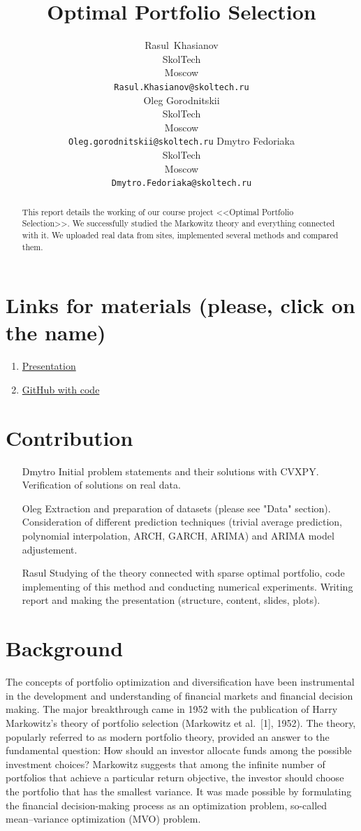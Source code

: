 \documentclass{article}
\title{Optimal Portfolio Selection}
\author{
  Rasul~Khasianov \\
  SkolTech\\
  Moscow \\
  \texttt{Rasul.Khasianov@skoltech.ru} \\
  \And
  Oleg Gorodnitskii\\
  SkolTech\\
  Moscow\\
  \texttt{Oleg.gorodnitskii@skoltech.ru}
  \And
  Dmytro Fedoriaka\\
  SkolTech\\
  Moscow\\
  \texttt{Dmytro.Fedoriaka@skoltech.ru}\\
}
\begin{document}
\maketitle

\begin{abstract} 
This report details the working of our course project <<Optimal Portfolio Selection>>. We successfully studied the Markowitz theory and everything connected with it. We uploaded real data from sites, implemented several methods and compared them.
\end{abstract}

\section*{Links for materials (please, click on the name)}
\begin{enumerate}
\item \href{https://nbviewer.jupyter.org/github/fedimser/MarkowitzPortfolio/blob/master/code/Markovitz_new.ipynb}{Presentation}
\item \href{https://github.com/fedimser/MarkowitzPortfolio}{GitHub with code}
\end{enumerate}

\section*{Contribution}
\begin{enumerate}
\item[Dmytro] Initial problem statements and their solutions with CVXPY. Verification of solutions on real data.
\item[Oleg\;\;\;\;\;] Extraction and preparation of datasets (please see "Data" section). Consideration of different prediction techniques (trivial average prediction, polynomial interpolation, ARCH, GARCH, ARIMA) and ARIMA model adjustement.
\item[Rasul\;\;\;] Studying of the theory connected with sparse optimal portfolio, code implementing of this method and conducting numerical experiments. Writing report and making the presentation (structure, content, slides, plots).
\end{enumerate}

\section{Background}
The concepts of portfolio optimization and diversification have been instrumental in the development and understanding of financial markets and financial decision making. The major breakthrough came in 1952 with the publication of Harry Markowitz’s theory of portfolio selection (Markowitz et al.\ [1], 1952). The theory, popularly referred to as modern portfolio theory, provided an answer to the fundamental question: How should an investor allocate funds among the possible investment choices? Markowitz suggests that among the infinite number of portfolios that achieve a particular return objective, the investor should choose the portfolio that has the smallest variance. It was made possible by formulating the financial decision-making process as an optimization problem, so-called mean–variance optimization (MVO) problem.
\end{document}

